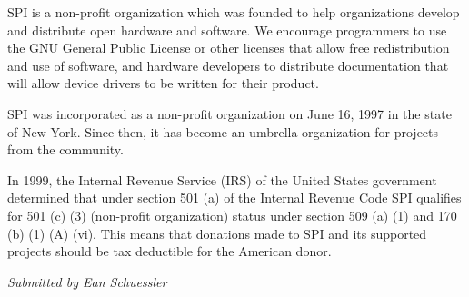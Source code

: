 \documentclass[letterpaper]{report}
\begin{document}
SPI is a non-profit organization which was founded to help organizations
develop and distribute open hardware and software. We encourage programmers
to use the GNU General Public License or other licenses that allow
free redistribution and use of software, and hardware developers to
distribute documentation that will allow device drivers to be written
for their product.

SPI was incorporated as a non-profit organization on June 16, 1997
in the state of New York. Since then, it has become an umbrella organization
for projects from the community.

In 1999, the Internal Revenue Service (IRS) of the United States government
determined that under section 501 (a) of the Internal Revenue Code
SPI qualifies for 501 (c) (3) (non-profit organization) status under
section 509 (a) (1) and 170 (b) (1) (A) (vi). This means that donations
made to SPI and its supported projects should be tax deductible for
the American donor.

\emph{Submitted by Ean Schuessler}
\end{document}
